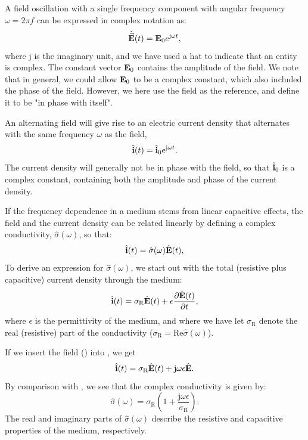 A field oscillation with a single frequency component with angular frequency $\omega = 2\pi f$ 
can be expressed in complex notation as:
\begin{equation}
\hat{\vec{{\bf E}}}(t) = {\bf E}_\text{0}e^{\mathrm{j}\omega t}, 
\label{eq:Sigma:Eomega}
\end{equation}
where $\mathrm{j}$ is the imaginary unit, and we have used a hat to indicate that an entity is complex.
The constant vector ${\bf E}_\text{0}$ contains the amplitude of the field. 
We note that in general, we could allow ${\bf E}_\text{0}$ to be a complex constant, 
which also included the phase of the field. 
However, we here use the field as the reference, and define it to be "in phase with itself".

An alternating field will give rise to an electric current density that
alternates with the same frequency $\omega$ as the field, 
\begin{equation}
\hat{{\bf i}}(t) = \hat{{\bf i}}_\text{0}e^{\mathrm{j}\omega t}.
\label{eq:Sigma:Iomega}
\end{equation}
The current density will generally not be in phase with the field,
so that $\hat{{\bf i}}_\text{0}$ is a complex constant, 
containing both the amplitude and phase of the current density.

If the frequency dependence in a medium stems from linear capacitive effects,
the field and the current density can be related linearly by defining
a complex conductivity, $\hat{\sigma}(\omega)$, so that:
\begin{equation}
\hat{{\bf i}}(t) = \hat{\sigma}(\omega) \hat{{\bf E}}(t), 
\label{eq:Sigma:WhatWeWant}
\end{equation}
To derive an expression for $\hat{\sigma}(\omega)$, 
we start out with the total (resistive plus capacitive) current density through the medium:
\begin{equation}
\hat{{\bf i}}(t) = \sigma_\text{R}\hat{{\bf E}}(t) +  \epsilon \frac{\partial \hat{{\bf E}}(t)}{\partial t},
\label{eq:Sigma:itot}
\end{equation}
where $\epsilon$ is the permittivity of the medium, 
and where we have let $\sigma_\text{R}$ denote the real (resistive) part of the conductivity 
($\sigma_\text{R} = \mathrm{Re}\hat{\sigma}(\omega)$).

If we insert the field () into , we get
\begin{equation}
\hat{{\bf i}}(t) = \sigma_\text{R}\hat{{\bf E}}(t) +  \mathrm{j}\omega\epsilon\hat{{\bf E}}.
\label{eq:Sigma:itot}
\end{equation}
By comparison with , we see that the
complex conductivity is given by:
\begin{equation}
\hat{\sigma}(\omega) = \sigma_\text{R}\left(1 + \frac{\mathrm{j} \omega \epsilon}{\sigma_\text{R}} \right).
\label{eq:Sigma:complex}
\end{equation}
The real and imaginary parts of $\hat{\sigma}(\omega)$ describe the 
resistive and capacitive properties of the medium, respectively. 

